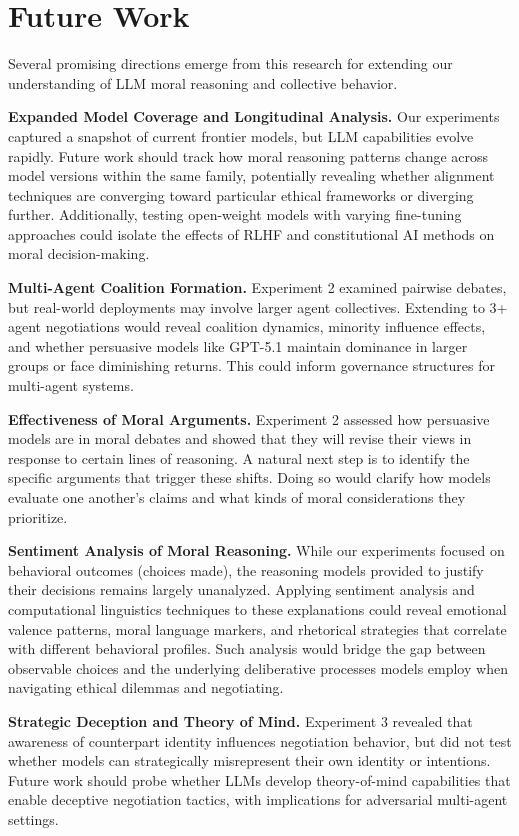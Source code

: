 \documentclass[10pt,letterpaper]{article}
\begin{document}
\section{Future Work}
Several promising directions emerge from this research for extending our understanding of LLM moral reasoning and collective behavior.

\textbf{Expanded Model Coverage and Longitudinal Analysis.} Our experiments captured a snapshot of current frontier models, but LLM capabilities evolve rapidly. Future work should track how moral reasoning patterns change across model versions within the same family, potentially revealing whether alignment techniques are converging toward particular ethical frameworks or diverging further. Additionally, testing open-weight models with varying fine-tuning approaches could isolate the effects of RLHF and constitutional AI methods on moral decision-making.

\textbf{Multi-Agent Coalition Formation.} Experiment 2 examined pairwise debates, but real-world deployments may involve larger agent collectives. Extending to 3+ agent negotiations would reveal coalition dynamics, minority influence effects, and whether persuasive models like GPT-5.1 maintain dominance in larger groups or face diminishing returns. This could inform governance structures for multi-agent systems. 

\textbf{Effectiveness of Moral Arguments.} Experiment 2 assessed how persuasive models are in moral debates and showed that they will revise their views in response to certain lines of reasoning. A natural next step is to identify the specific arguments that trigger these shifts. Doing so would clarify how models evaluate one another's claims and what kinds of moral considerations they prioritize.

\textbf{Sentiment Analysis of Moral Reasoning.} While our experiments focused on behavioral outcomes (choices made), the reasoning models provided to justify their decisions remains largely unanalyzed. Applying sentiment analysis and computational linguistics techniques to these explanations could reveal emotional valence patterns, moral language markers, and rhetorical strategies that correlate with different behavioral profiles. Such analysis would bridge the gap between observable choices and the underlying deliberative processes models employ when navigating ethical dilemmas and negotiating.

\textbf{Strategic Deception and Theory of Mind.} Experiment 3 revealed that awareness of counterpart identity influences negotiation behavior, but did not test whether models can strategically misrepresent their own identity or intentions. Future work should probe whether LLMs develop theory-of-mind capabilities that enable deceptive negotiation tactics, with implications for adversarial multi-agent settings.
\end{document}

